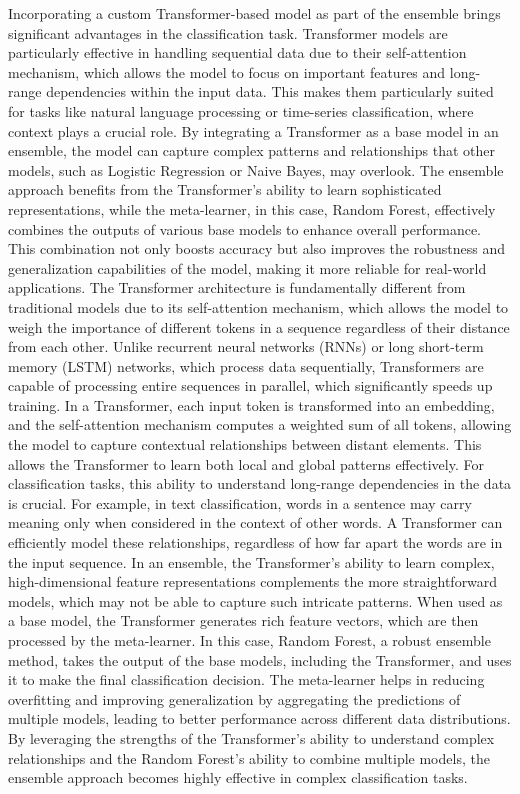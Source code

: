 \noindent
Incorporating a custom Transformer-based model as part of the ensemble brings significant advantages in the classification task. Transformer models are particularly effective in handling sequential data due to their self-attention mechanism, which allows the model to focus on important features and long-range dependencies within the input data. This makes them particularly suited for tasks like natural language processing or time-series classification, where context plays a crucial role. By integrating a Transformer as a base model in an ensemble, the model can capture complex patterns and relationships that other models, such as Logistic Regression or Naive Bayes, may overlook. The ensemble approach benefits from the Transformer’s ability to learn sophisticated representations, while the meta-learner, in this case, Random Forest, effectively combines the outputs of various base models to enhance overall performance. This combination not only boosts accuracy but also improves the robustness and generalization capabilities of the model, making it more reliable for real-world applications. The Transformer architecture is fundamentally different from traditional models due to its self-attention mechanism, which allows the model to weigh the importance of different tokens in a sequence regardless of their distance from each other. Unlike recurrent neural networks (RNNs) or long short-term memory (LSTM) networks, which process data sequentially, Transformers are capable of processing entire sequences in parallel, which significantly speeds up training. In a Transformer, each input token is transformed into an embedding, and the self-attention mechanism computes a weighted sum of all tokens, allowing the model to capture contextual relationships between distant elements. This allows the Transformer to learn both local and global patterns effectively. For classification tasks, this ability to understand long-range dependencies in the data is crucial. For example, in text classification, words in a sentence may carry meaning only when considered in the context of other words. A Transformer can efficiently model these relationships, regardless of how far apart the words are in the input sequence. In an ensemble, the Transformer’s ability to learn complex, high-dimensional feature representations complements the more straightforward models, which may not be able to capture such intricate patterns. When used as a base model, the Transformer generates rich feature vectors, which are then processed by the meta-learner. In this case, Random Forest, a robust ensemble method, takes the output of the base models, including the Transformer, and uses it to make the final classification decision. The meta-learner helps in reducing overfitting and improving generalization by aggregating the predictions of multiple models, leading to better performance across different data distributions. By leveraging the strengths of the Transformer’s ability to understand complex relationships and the Random Forest’s ability to combine multiple models, the ensemble approach becomes highly effective in complex classification tasks.


